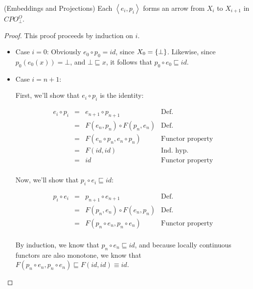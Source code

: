 \begin{lemma}{(Embeddings and Projections)} Each $\left<e_i, p_i\right>$ forms
an arrow from $X_i$ to $X_{i+1}$ in $CPO_\bot^O$.
\end{lemma}

\begin{proof}
This proof proceeds by induction on $i$. 
\begin{itemize}
\item Case $i=0$: Obviously $e_0 \circ p_0 = id$, since $X_0 = \{{\bot}\}$.  
  Likewise, since $p_0(e_0(x)) = \bot$, and $\bot \sqsubseteq x$, it follows that
  $p_0 \circ e_0 \sqsubseteq id$. 

\item Case $i=n+1$: 

  First, we'll show that $e_i \circ p_i$ is the identity: 

  \begin{displaymath}
    \begin{array}{lcll}
      e_i \circ p_i & = & e_{n+1} \circ p_{n+1}            & \mbox{Def.}\\ 
                    & = & F(e_n, p_n) \circ F(p_n, e_n)   & \mbox{Def.}\\ 
                    & = & F(e_n \circ p_n, e_n \circ p_n) & \mbox{Functor property}\\ 
                    & = & F(id, id)                       & \mbox{Ind. hyp.}\\  
                    & = & id                              & \mbox{Functor property} \\
    \end{array}
  \end{displaymath}

  \noindent Now, we'll show that $p_i \circ e_i \sqsubseteq id$: 

  \begin{displaymath}
    \begin{array}{lcll}
      p_i \circ e_i & = & p_{n+1} \circ e_{n+1}            & \mbox{Def.}\\ 
                    & = & F(p_n, e_n) \circ F(e_n, p_n)   & \mbox{Def.}\\ 
                    & = & F(p_n \circ e_n, p_n \circ e_n) & \mbox{Functor property}\\ 
    \end{array}
  \end{displaymath}

  \noindent By induction, we know that $p_n \circ e_n \sqsubseteq id$, and
  because locally continuous functors are also monotone, we know that 
  $F(p_n \circ e_n, p_n \circ e_n) \sqsubseteq F(id, id) \equiv id$.
\end{itemize}
\end{proof}


